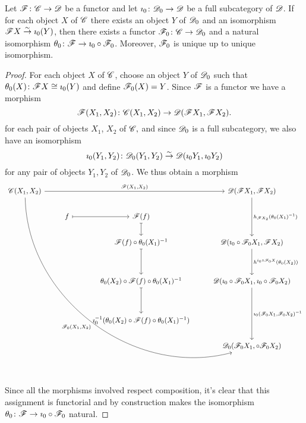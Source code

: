 \documentclass[10pt]{amsart}
\begin{document}
\begin{lem}\label{factorization}
  Let $\mathscr{F} \colon \mathscr{C} \to \mathscr{D}$ be a functor and let $\imath_0 \colon \mathscr{D}_0 \to \mathscr{D}$ be a full subcategory of $\mathscr{D}$.
  If for each object $X$ of $\mathscr{C}$ there exists an object $Y$ of $\mathscr{D}_0$ and an isomorphism $\mathscr{F} X \overset{\sim}\to \imath_0(Y)$, then there exists a functor $\mathscr{F}_0 \colon \mathscr{C} \to \mathscr{D}_0$ and a natural isomorphism $\theta_0 \colon \mathscr{F} \to \imath_0 \circ \mathscr{F}_0$.
  Moreover, $\mathscr{F}_0$ is unique up to unique isomorphism.
  
  \begin{proof}
    For each object $X$ of $\mathscr{C}$, choose an object $Y$ of $\mathscr{D}_0$ such that $\theta_0(X) \colon \mathscr{F} X \cong \imath_0(Y)$ and define $\mathscr{F}_0(X) = Y$.
    Since $\mathscr{F}$ is a functor we have a morphism 
    $$\mathscr{F}(X_1,X_2) \colon \mathscr{C}(X_1,X_2) \to \mathscr{D}(\mathscr{F} X_1, \mathscr{F} X_2).$$
    for each pair of objects $X_1$, $X_2$ of $\mathscr{C},$
    and since $\mathscr{D}_0$ is a full subcategory, we also have an isomorphism
    $$\imath_0(Y_1,Y_2) \colon \mathscr{D}_0(Y_1, Y_2) \overset{\sim}\to \mathscr{D}(\imath_0 Y_1, \imath_0 Y_2)$$
    for any pair of objects $Y_1, Y_2$ of $\mathscr{D}_0$.
    We thus obtain a morphism
    $$\begin{tikzcd}
      \C(X_1, X_2) \arrow[swap,bend right=52]{dddddddrrr}{\F_0(X_1,X_2)}\arrow{rrr}{\F(X_1,X_2)} & & & \D(\F X_1, \F X_2) \arrow{dd}{h_{\F X_2}(\theta_0(X_1)^{-1})}\\
      & f \arrow[mapsto]{r} & \F(f)\arrow[mapsto]{d}\\
      & & \F(f) \circ \theta_0(X_1)^{-1}\arrow[mapsto]{dd}& \D(\imath_0 \circ \F_0 X_1, \F X_2) \arrow{dd}{h^{i_0\circ \F_0 X}(\theta_0(X_2))}\\
      \\
      & & \theta_0(X_2) \circ \F(f) \circ \theta_0(X_1)^{-1} \arrow[mapsto]{dd}& \D(\imath_0 \circ \F_0 X_1, \imath_0 \circ \F_0 X_2)\arrow{ddd}{\imath_0(\F_0 X_1, \F_0 X_2)^{-1}}\\
      \\
      & & \imath_0^{-1}(\theta_0(X_2) \circ \F(f) \circ \theta_0(X_1)^{-1})\\
      & & & \D_0(\F_0 X_1, \circ \F_0 X_2)
    \end{tikzcd}$$
    Since all the morphisms involved respect composition, it's clear that this assignment is functorial and by construction makes the isomorphism $\theta_0 \colon \mathscr{F} \to \imath_0 \circ \mathscr{F}_0$ natural.


\end{proof}
\end{lem}
\end{document}
